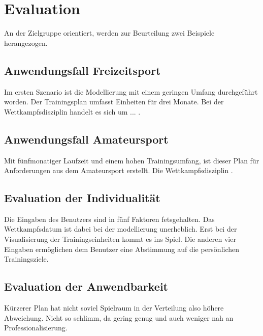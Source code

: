 \chapter{Evaluation}
\label{sec:evaluation}
An der Zielgruppe orientiert, werden zur Beurteilung zwei Beispiele herangezogen.

\section{Anwendungsfall Freizeitsport}
Im ersten Szenario ist die Modellierung mit einem geringen Umfang durchgeführt worden. Der Trainingsplan umfasst Einheiten für drei Monate. Bei der Wettkampfsdisziplin handelt es sich um ... . 

\section{Anwendungsfall Amateursport}
Mit fünfmonatiger Laufzeit und einem hohen Trainingsumfang, ist dieser Plan für Anforderungen aus dem Amateursport erstellt. Die Wettkampfsdisziplin .

\section{Evaluation der Individualität}
Die Eingaben des Benutzers sind in fünf Faktoren fetsgehalten. Das Wettkampfsdatum ist dabei bei der modellierung unerheblich. Erst bei der Visualisierung der Trainingseinheiten kommt es ins Spiel. Die anderen vier Eingaben ermöglichen dem Benutzer eine Abstimmung auf die persönlichen Trainingsziele. 

\section{Evaluation der Anwendbarkeit}
Kürzerer Plan hat nicht soviel Spielraum in der Verteilung also höhere Abweichung. Nicht so schlimm, da gering genug und auch weniger nah an Professionalisierung.